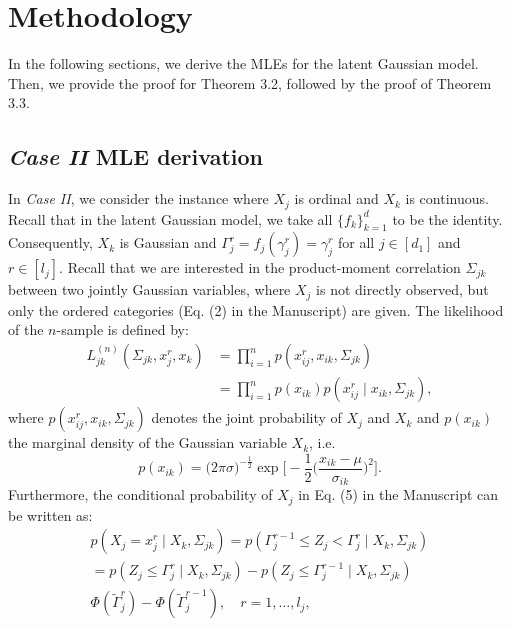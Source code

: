 
\section{Methodology}

In the following sections, we derive the MLEs for the latent Gaussian model. Then, we provide the proof for Theorem 3.2, followed by the proof of Theorem 3.3.

\subsection{\textit{Case II} MLE derivation}

In \textit{Case II}, we consider the instance where $X_j$ is ordinal and $X_k$ is continuous. Recall that in the latent Gaussian model, we take all \(\{f_k\}_{k=1}^d\) to be the identity. Consequently, \(X_k\) is Gaussian and \(\Gamma_j^r = f_j(\gamma_j^r) = \gamma_j^r\) for all \(j \in [d_1]\) and \(r \in [l_j]\). Recall that we are interested in the product-moment correlation $\Sigma_{jk}$ between two jointly Gaussian variables, where $X_j$ is not directly observed, but only the ordered categories (Eq. (2) in the Manuscript) are given. The likelihood of the $n$-sample is defined by:
\begin{equation}\label{polyserial_likelihood_appendix}
    \begin{split}
        L_{jk}^{(n)}(\Sigma_{jk}, x_j^r,x_k) &= \prod_{i=1}^n p(x_{ij}^{r},x_{ik}, \Sigma_{jk}) \\
        &= \prod_{i=1}^n p(x_{ik})p(x_{ij}^{r} \mid x_{ik}, \Sigma_{jk}),
    \end{split}
\end{equation}
where $p(x_{ij}^{r},x_{ik}, \Sigma_{jk})$ denotes the joint probability of  $X_j$ and $X_k$ and $p(x_{ik})$ the marginal density of the Gaussian variable $X_k$, i.e.
\begin{equation*}\label{marginal_normal}
    p(x_{ik}) = \big(2\pi\sigma\big)^{-\frac{1}{2}} \exp\Bigg[-\frac{1}{2}\bigg(\frac{x_{ik} - \mu}{\sigma_{ik}}\bigg)^2\Bigg].
\end{equation*}
Furthermore, the conditional probability of $X_j$ in Eq. %
(5) in the Manuscript can be written as:
\begin{equation}\label{threshold_conditionalprob}
    \begin{split}
        p(X_j = x_j^r \mid X_k, \Sigma_{jk}) = p(\Gamma_j^{r-1} \leq Z_j < \Gamma_j^r \mid X_k, \Sigma_{jk}) \\
        = p(Z_j \leq \Gamma_j^{r} \mid X_k, \Sigma_{jk}) - p(Z_j \leq \Gamma_j^{r-1} \mid X_k, \Sigma_{jk}) \\
        \Phi(\tilde{\Gamma}_j^{r}) - \Phi(\tilde{\Gamma}_j^{r-1}), \quad r = 1, \dots, l_{j},
    \end{split}
\end{equation}
